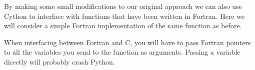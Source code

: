 By making some small modifications to our original approach we can also use Cython to interface with functions that have been written in Fortran.
Here we will consider a simple Fortran implementation of the same function as before.
\begin{info}
When interfacing between Fortran and C, you will have to pass Fortran pointers to all the variables you send to the function as arguments.
Passing a variable directly will probably crash Python.
\end{info}





